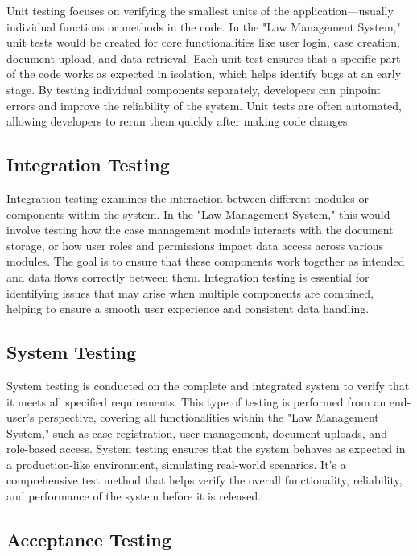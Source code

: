 Unit testing focuses on verifying the smallest units of the application—usually individual functions or methods in the code. In the "Law Management System," unit tests would be created for core functionalities like user login, case creation, document upload, and data retrieval. Each unit test ensures that a specific part of the code works as expected in isolation, which helps identify bugs at an early stage. By testing individual components separately, developers can pinpoint errors and improve the reliability of the system. Unit tests are often automated, allowing developers to rerun them quickly after making code changes.

\subsection{Integration Testing}

Integration testing examines the interaction between different modules or components within the system. In the "Law Management System," this would involve testing how the case management module interacts with the document storage, or how user roles and permissions impact data access across various modules. The goal is to ensure that these components work together as intended and data flows correctly between them. Integration testing is essential for identifying issues that may arise when multiple components are combined, helping to ensure a smooth user experience and consistent data handling.

\subsection{System Testing}

System testing is conducted on the complete and integrated system to verify that it meets all specified requirements. This type of testing is performed from an end-user’s perspective, covering all functionalities within the "Law Management System," such as case registration, user management, document uploads, and role-based access. System testing ensures that the system behaves as expected in a production-like environment, simulating real-world scenarios. It’s a comprehensive test method that helps verify the overall functionality, reliability, and performance of the system before it is released.

\subsection{Acceptance Testing}

